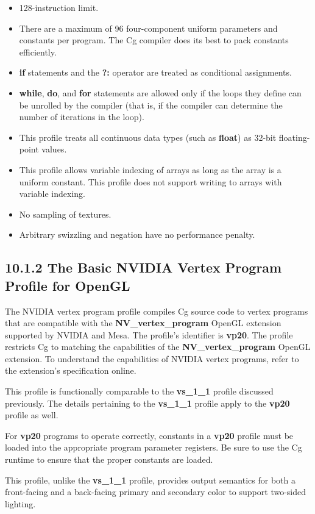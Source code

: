 \documentclass[../main.tex]{subfiles}
\begin{document}
\begin{itemize}
\item 128-instruction limit.
\item There are a maximum of 96 four-component uniform parameters and constants per program. The Cg compiler does its best to pack constants efficiently.
\item \textbf{if} statements and the \textbf{?:} operator are treated as conditional assignments.
\item \textbf{while}, \textbf{do}, and \textbf{for} statements are allowed only if the loops they define can be unrolled by the compiler (that is, if the compiler can determine the number of iterations in the loop).
\item This profile treats all continuous data types (such as \textbf{float}) as 32-bit floating-point values.
\item This profile allows variable indexing of arrays as long as the array is a uniform constant. This profile does not support writing to arrays with variable indexing.
\item No sampling of textures.
\item Arbitrary swizzling and negation have no performance penalty.
\end{itemize}

\subsection{10.1.2 The Basic NVIDIA Vertex Program Profile for OpenGL}

The NVIDIA vertex program profile compiles Cg source code to vertex programs that are compatible with the \textbf{NV_vertex_program} OpenGL extension supported by NVIDIA and Mesa. The profile's identifier is \textbf{vp20}. The profile restricts Cg to matching the capabilities of the \textbf{NV_vertex_program} OpenGL extension. To understand the capabilities of NVIDIA vertex programs, refer to the extension's specification online.

This profile is functionally comparable to the \textbf{vs_1_1} profile discussed previously. The details pertaining to the \textbf{vs_1_1} profile apply to the \textbf{vp20} profile as well.

For \textbf{vp20} programs to operate correctly, constants in a \textbf{vp20} profile must be loaded into the appropriate program parameter registers. Be sure to use the Cg runtime to ensure that the proper constants are loaded.

This profile, unlike the \textbf{vs_1_1} profile, provides output semantics for both a front-facing and a back-facing primary and secondary color to support two-sided lighting.
\end{document}
